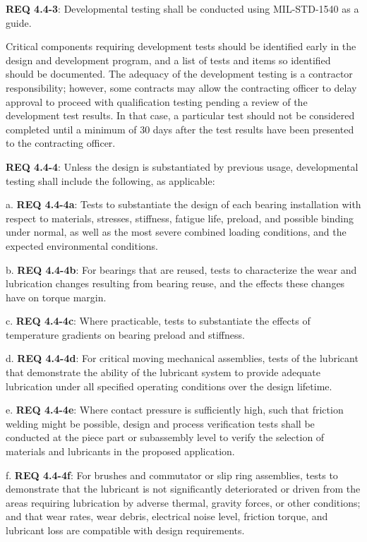 \documentclass[12pt]{article}
\begin{document}
\noindent \textbf{REQ 4.4-3}: Developmental testing shall be conducted using MIL-STD-1540 as a guide. 

Critical components requiring development tests should be identified early in the design and development program, and a list of tests and items so identified should be documented. 
The adequacy of the development testing is a contractor responsibility; however, some contracts may allow the contracting officer to delay approval to proceed with qualification testing pending a review of the development test results. 
In that case, a particular test should not be considered completed until a minimum of 30 days after the test results have been presented to the contracting officer. 

\noindent \textbf{REQ 4.4-4}: Unless the design is substantiated by previous usage, developmental testing shall include the following, as applicable:

a. \noindent \textbf{REQ 4.4-4a}: Tests to substantiate the design of each bearing installation with respect to materials, stresses, stiffness, fatigue life, preload, and possible binding under normal, as well as the most severe combined loading conditions, and the expected environmental conditions.

b. \noindent \textbf{REQ 4.4-4b}: For bearings that are reused, tests to characterize the wear and lubrication changes resulting from bearing reuse, and the effects these changes have on torque margin.

c. \noindent \textbf{REQ 4.4-4c}: Where practicable, tests to substantiate the effects of temperature gradients on bearing preload and stiffness.

d. \noindent \textbf{REQ 4.4-4d}: For critical moving mechanical assemblies, tests of the lubricant that demonstrate the ability of the lubricant system to provide adequate lubrication under all specified operating conditions over the design lifetime.

e. \noindent \textbf{REQ 4.4-4e}: Where contact pressure is sufficiently high, such that friction welding might be possible, design and process verification tests shall be conducted at the piece part or subassembly level to verify the selection of materials and lubricants in the proposed application.

f. \noindent \textbf{REQ 4.4-4f}: For brushes and commutator or slip ring assemblies, tests to demonstrate that the lubricant is not significantly deteriorated or driven from the areas requiring lubrication by adverse thermal, gravity forces, or other conditions; and that wear rates, wear debris, electrical noise level, friction torque, and lubricant loss are compatible with design requirements.
\end{document}
